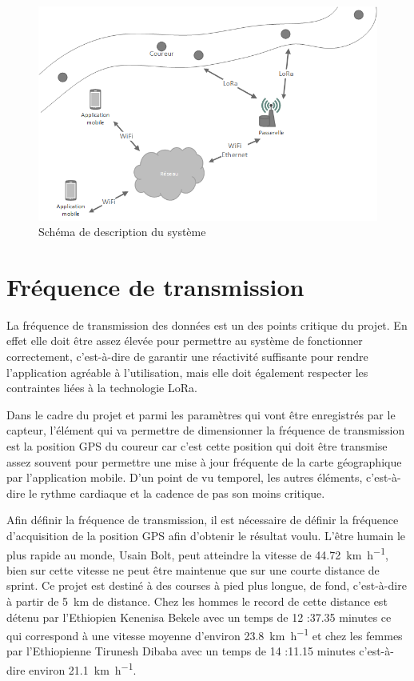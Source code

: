 \begin{figure}[htb]
\centering 
\includegraphics[width=1\columnwidth]{../images/schema_systeme_projet.png} 
\caption[Schéma de description du système]{Schéma de description du système}
\label{fig:elem_system}
\end{figure}

\section{Fréquence de transmission}

La fréquence de transmission des données est un des points critique du projet. En effet elle doit être assez élevée pour permettre au système de fonctionner correctement, c’est-à-dire de garantir une réactivité suffisante pour rendre l’application agréable à l’utilisation, mais elle doit également respecter les contraintes liées à la technologie LoRa.

Dans le cadre du projet et parmi les paramètres qui vont être enregistrés par le capteur, l’élément qui va permettre de dimensionner la fréquence de transmission est la position GPS du coureur car c’est cette position qui doit être transmise assez souvent pour permettre une mise à jour fréquente de la carte géographique par l’application mobile. D’un point de vu temporel, les autres éléments, c’est-à-dire le rythme cardiaque et la cadence de pas son moins critique.

Afin définir la fréquence de transmission, il est nécessaire de définir la fréquence d’acquisition de la position GPS afin d’obtenir le résultat voulu. L’être humain le plus rapide au monde, Usain Bolt, peut atteindre la vitesse de \SI{44.72}{\km\per\hour}, bien sur cette vitesse ne peut être maintenue que sur une courte distance de sprint. Ce projet est destiné à des courses à pied plus longue, de fond, c’est-à-dire à partir de \SI{5}{\km} de distance. Chez les hommes le record de cette distance est détenu par l’Ethiopien Kenenisa Bekele avec un temps de 12 :37.35 minutes ce qui correspond à une vitesse moyenne d’environ \SI{23.8}{\km\per\hour} et chez les femmes par l’Ethiopienne Tirunesh Dibaba avec un temps de 14 :11.15 minutes c’est-à-dire environ \SI{21.1}{\km\per\hour}. \cite{iaff_all_time_top_list}

